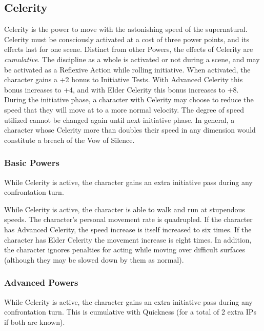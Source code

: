 \subsection{Celerity}

Celerity is the power to move with the astonishing speed of the supernatural. Celerity must be consciously activated at a cost of three power points, and its effects last for one scene. Distinct from other Powers, the effects of Celerity are \textit{cumulative}. The discipline as a whole is activated or not during a scene, and may be activated as a Reflexive Action while rolling initiative. When activated, the character gains a +2 bonus to Initiative Tests. With Advanced Celerity this bonus increases to +4, and with Elder Celerity this bonus increases to +8. During the initiative phase, a character with Celerity may choose to reduce the speed that they will move at to a more normal velocity. The degree of speed utilized cannot be changed again until next initiative phase. In general, a character whose Celerity more than doubles their speed in any dimension would constitute a breach of the Vow of Silence.

\subsubsection{Basic Powers}

 While Celerity is active, the character gains an extra initiative pass during any confrontation turn.

 While Celerity is active, the character is able to walk and run at stupendous speeds. The character's personal movement rate is quadrupled. If the character has Advanced Celerity, the speed increase is itself increased to six times. If the character has Elder Celerity the movement increase is eight times. In addition, the character ignores penalties for acting while moving over difficult surfaces (although they may be slowed down by them as normal).


\subsubsection{Advanced Powers}

 While Celerity is active, the character gains an extra initiative pass during any confrontation turn. This is cumulative with Quickness (for a total of 2 extra IPs if both are known).

